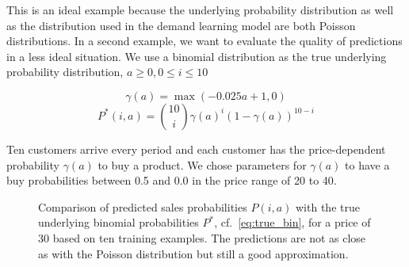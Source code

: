This is an ideal example because the underlying probability distribution as well as the distribution used in the demand learning model are both Poisson distributions.
In a second example, we want to evaluate the quality of predictions in a less ideal situation.
We use a binomial distribution as the true underlying probability distribution, $a \geq 0, 0 \leq i \leq 10$

\begin{equation}
\gamma(a) = \max(-0.025 a + 1, 0)
\end{equation}
\begin{equation}
P^*(i, a) = \binom{10}{i} \gamma(a)^i (1 - \gamma(a))^{10-i}
\label{eq:true_bin}
\end{equation}

Ten customers arrive every period and each customer has the price-dependent probability $\gamma(a)$ to buy a product.
We chose parameters for $\gamma(a)$ to have a buy probabilities between 0.5 and 0.0 in the price range of 20 to 40.

\begin{figure}[t]
	\caption[Comparison of Predicted Probabilites with Underlying Binomial Probabilities]{Comparison of predicted sales probabilities $P(i,a)$ with the true underlying binomial probabilities $P^*$, cf.~\cref{eq:true_bin}, for a price of 30 based on ten training examples. The predictions are not as close as with the Poisson distribution but still a good approximation.}
	\label{fig:probs_binom}
\end{figure}

